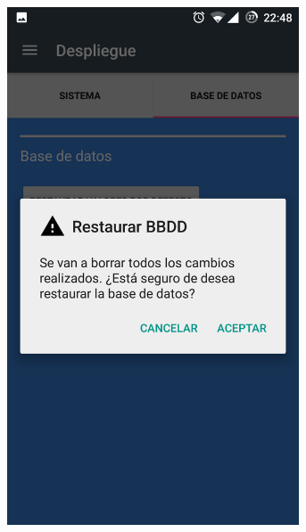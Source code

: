 \documentclass[../PFC.tex]{subfiles}
\begin{document}
\begin{figure}[H]
    \begin{subfigure}{0.32\textwidth}
		\centering
		\includegraphics[width=0.95\textwidth]{./img/app/despliegueBaseDeDatosDialog}
    \end{subfigure}
    \begin{subfigure}{0.32\textwidth}  
       \centering

\end{subfigure}
\end{figure}
\end{document}
